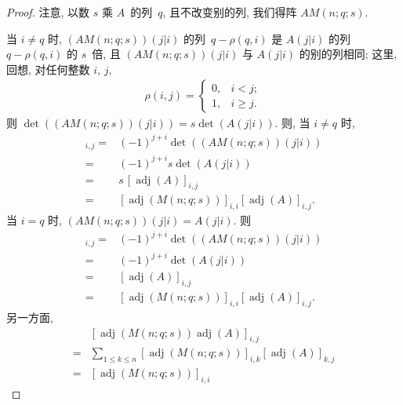 \documentclass[../libro.tex]{subfiles}
\begin{document}
\begin{proof}
    注意, 以数 \(s\) 乘 \(A\)~的列~\(q\),
    且不改变别的列,
    我们得阵 \(A M(n; q; s)\).

    当 \(i \neq q\) 时,
    \((A M(n; q; s))(j|i)\) 的列~\(q - \rho(q, i)\)
    是 \(A(j|i)\) 的列~\(q - \rho(q, i)\)
    的 \(s\)~倍,
    且 \((A M(n; q; s))(j|i)\) 与 \(A(j|i)\)
    的别的列相同;
    这里, 回想, 对任何整数 \(i\), \(j\),
    \begin{align*}
        \rho(i, j) =
        \begin{cases}
            0, & i < j;    \\
            1, & i \geq j.
        \end{cases}
    \end{align*}
    则 \(\det {((A M(n; q; s))(j|i))}
    = s \det {(A(j|i))}\).
    则, 当 \(i \neq q\) 时,
    \begin{align*}
        [\operatorname{adj} {(A M(n; q; s))}]_{i,j}
        = {} &
        (-1)^{j+i} \det {((A M(n; q; s))(j|i))}
        \\
        = {} &
        (-1)^{j+i} s \det {(A(j|i))}
        \\
        = {} &
        s\, [\operatorname{adj} {(A)}]_{i,j}
        \\
        = {} &
        [\operatorname{adj} {(M(n; q; s))}]_{i,i}
        [\operatorname{adj} {(A)}]_{i,j}.
    \end{align*}
    当 \(i = q\) 时,
    \((A M(n; q; s))(j|i) = A(j|i)\).
    则
    \begin{align*}
        [\operatorname{adj} {(A M(n; q; s))}]_{i,j}
        = {} &
        (-1)^{j+i} \det {((A M(n; q; s))(j|i))}
        \\
        = {} &
        (-1)^{j+i} \det {(A(j|i))}
        \\
        = {} &
        [\operatorname{adj} {(A)}]_{i,j}
        \\
        = {} &
        [\operatorname{adj} {(M(n; q; s))}]_{i,i}
        [\operatorname{adj} {(A)}]_{i,j}.
    \end{align*}
    另一方面,
    \begin{align*}
        &
        [\operatorname{adj} {(M(n; q; s))}
        \operatorname{adj} {(A)}]_{i,j}
        \\
        = {} &
        \sum_{1 \leq k \leq n}
        {[\operatorname{adj} {(M(n; q; s))}]_{i,k}
        [\operatorname{adj} {(A)}]_{k,j}}
        \\
        = {} &
        [\operatorname{adj} {(M(n; q; s))}]_{i,i}

\end{align*}
\end{proof}
\end{document}
